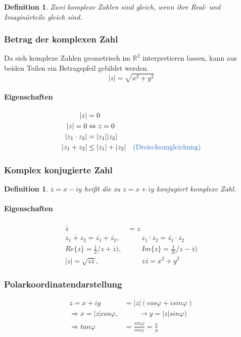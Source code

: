 \documentclass[12pt,a4paper]{article}%
\newtheorem{definition}[satz]{Definition}
\numberwithin{equation}{section}
\newcommand{\R}{\mathbb{R}} %
\newcommand{\subsubsubsection}{\paragraph}
\def\colBlue#1{\begingroup\color{NavyBlue}{#1}\endgroup}
\numberwithin{equation}{subsection}
\begin{document}
	\begin{definition} 
	  \glqq Zwei komplexe Zahlen sind gleich, wenn ihre Real- und Imaginärteile gleich sind. \grqq \cite{HM12}
	\end{definition}
	
		\subsubsection{Betrag der komplexen Zahl}
		Da sich komplexe Zahlen geometrisch im $\R^2$ interpretieren lassen, kann aus beiden Teilen ein Betragspfeil gebildet werden.
		\begin{equation}
		  |z| = \sqrt{x^2 + y^2}
		\end{equation}
		
		\subsubsubsection{Eigenschaften}
  	\begin{align}
		  |z| &= 0\\
			|z| = 0 &\Leftrightarrow z = 0\\
			|z_1 \cdot z_2| &= |z_1| |z_2|\\
			|z_1 + z_2| &\leq |z_1| + |z_2| \quad \text{\colBlue{(Dreiecksungleichung)}}
		\end{align}
		
		\subsubsection{Komplex konjugierte Zahl}
		\begin{definition} 
		  \glqq $\overline{z} = x -iy$ heißt die zu $z = x + iy$ konjugiert komplexe Zahl. \grqq \cite{HM12}
		\end{definition}
		
		\subsubsubsection{Eigenschaften}
		\begin{align}
			\overline{\overline{z}} &= z \\
			\overline{z_1 + z_2} = \overline{z_1} + \overline{z_2},&\qquad \overline{z_1 \cdot z_2} = \overline{z_1} \cdot \overline{z_2} \\
			Re\{z\} = \frac{1}{2} /z + \overline{z}), &\qquad Im\{z\} = \frac{1}{2i} /z - \overline{z})\\
			|z| = \sqrt{z \overline{z}}, &\qquad z\overline{z} = x^2 + y^2
		\end{align}
			
		\subsubsection{Polarkoordinatendarstellung}
		\begin{align}
			z = x + iy &= |z|(cos\varphi + isin\varphi)\\
			\Rightarrow x = |z| cos\varphi, &\qquad \rightarrow y = |z| sin\varphi) \nonumber\\
			\Rightarrow tan \varphi &= \frac{sin \varphi}{cos \varphi} = \frac{x}{y}
		\end{align}
		
\end{document}
